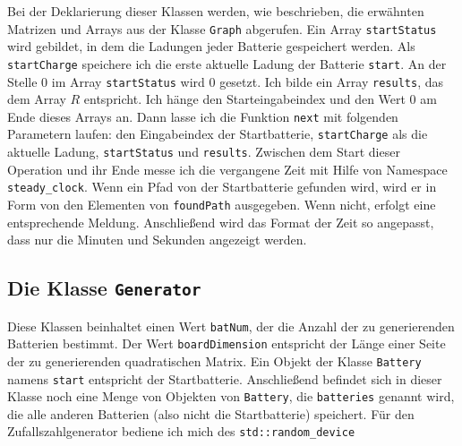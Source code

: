 \documentclass[a4paper,10pt,ngerman]{scrartcl}
\begin{document}
Bei der Deklarierung dieser Klassen werden, wie beschrieben, die erwähnten Matrizen und Arrays aus der Klasse \texttt{Graph}
abgerufen. Ein Array \texttt{startStatus} wird gebildet, in dem die Ladungen jeder Batterie gespeichert werden. 
Als \texttt{startCharge} speichere ich die erste aktuelle Ladung der Batterie \texttt{start}. An der Stelle 0 im Array
\texttt{startStatus} wird 0 gesetzt. Ich bilde ein Array \texttt{results}, das dem Array $R$ entspricht.
Ich hänge den Starteingabeindex und den Wert 0 am Ende dieses Arrays an. Dann lasse ich die Funktion \texttt{next} mit
folgenden Parametern laufen: den Eingabeindex der Startbatterie, \texttt{startCharge} als die aktuelle Ladung, \texttt{startStatus}
und \texttt{results}. Zwischen dem Start dieser Operation und ihr Ende messe ich die vergangene Zeit mit Hilfe von 
Namespace \texttt{steady\_clock}. Wenn ein Pfad von der Startbatterie gefunden wird, wird er in Form von den Elementen von
\texttt{foundPath} ausgegeben. Wenn nicht, erfolgt eine entsprechende Meldung. Anschließend wird das Format der Zeit so angepasst, 
dass nur die Minuten und Sekunden angezeigt werden.

\subsection{Die Klasse \texttt{Generator}}
Diese Klassen beinhaltet einen Wert \texttt{batNum}, der die Anzahl der zu generierenden Batterien bestimmt.
Der Wert \texttt{boardDimension} entspricht der Länge einer Seite der zu generierenden quadratischen Matrix.
Ein Objekt der Klasse \texttt{Battery} namens \texttt{start} entspricht der Startbatterie. Anschließend
befindet sich in dieser Klasse noch eine Menge von Objekten von \texttt{Battery}, die \texttt{batteries} genannt wird,
die alle anderen Batterien (also nicht die Startbatterie) speichert. Für den Zufallszahlgenerator bediene ich mich des
\texttt{std::random\_device}\\
\end{document}
